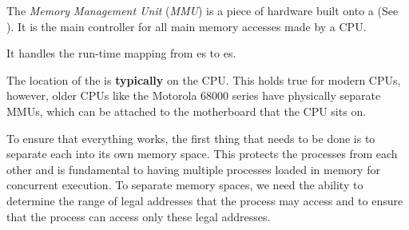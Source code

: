\begin{definition}\label{def:Memory_Management_Unit}
  The \emph{Memory Management Unit} (\emph{MMU}) is a piece of hardware built onto a  (See ).
  It is the main controller for all main memory accesses made by a CPU.\@

  It handles the run-time mapping from es to es.

  \begin{remark}\label{rmk:MMU_Location}
    The location of the  is \textbf{typically} on the CPU.\@
    This holds true for modern CPUs, however, older CPUs like the Motorola 68000 series have physically separate MMUs, which can be attached to the motherboard that the CPU sits on.
  \end{remark}
\end{definition}

To ensure that everything works, the first thing that needs to be done is to separate each  into its own memory space.
This protects the processes from each other and is fundamental to having multiple processes loaded in memory for concurrent execution.
To separate memory spaces, we need the ability to determine the range of legal addresses that the process may access and to ensure that the process can access only these legal addresses.











